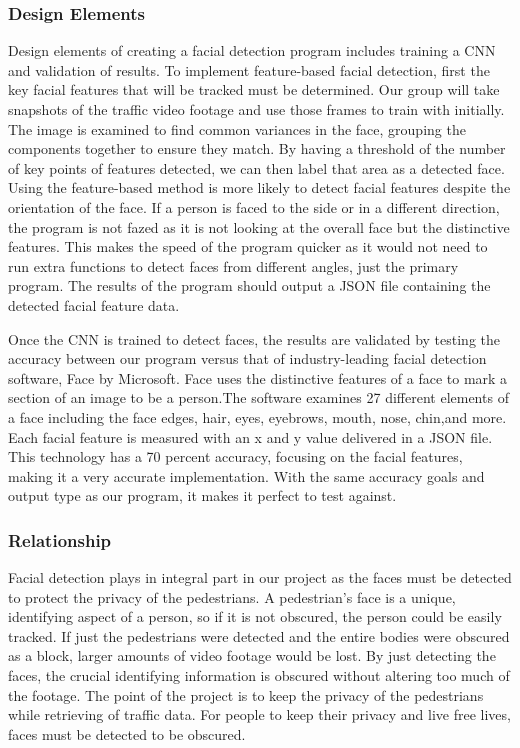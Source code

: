 \documentclass[onecolumn, draftclsnofoot,10pt, compsoc]{IEEEtran}
\begin{document}
\subsubsection{Design Elements}
Design elements of creating a facial detection program includes training a CNN and validation of results. To implement feature-based facial detection, first the key facial features that will be tracked must be determined. Our group will take snapshots of the traffic video footage and use those frames to train with initially. The image is examined to find common variances in the face, grouping the components together to ensure they match. By having a threshold of the number of key points of features detected, we can then label that area as a detected face. Using the feature-based method is more likely to detect facial features despite the orientation of the face. If a person is faced to the side or in a different direction, the program is not fazed as it is not looking at the overall face but the distinctive features. This makes the speed of the program quicker as it would not need to run extra functions to detect faces from different angles, just the primary program. The results of the program should output a JSON file containing the detected facial feature data.

Once the CNN is trained to detect faces, the results are validated by testing the accuracy between our program versus that of industry-leading facial detection software, Face by Microsoft. Face uses the distinctive features of a face to mark a section of an image to be a person.The software examines 27 different elements of a face including the face edges, hair, eyes, eyebrows, mouth, nose, chin,and more. Each facial feature is measured with an x and y value delivered in a JSON file. This technology has a 70 percent accuracy, focusing on the facial features, making it a very accurate implementation. With the same accuracy goals and output type as our program, it makes it perfect to test against. 
\subsubsection{Relationship}
Facial detection plays in integral part in our project as the faces must be detected to protect the privacy of the pedestrians. A pedestrian’s face is a unique, identifying aspect of a person, so if it is not obscured, the person could be easily tracked. If just the pedestrians were detected and the entire bodies were obscured as a block, larger amounts of video footage would be lost. By just detecting the faces, the crucial identifying information is obscured without altering too much of the footage. The point of the project is to keep the privacy of the pedestrians while retrieving of traffic data. For people to keep their privacy and live free lives, faces must be detected to be obscured.
\end{document}
